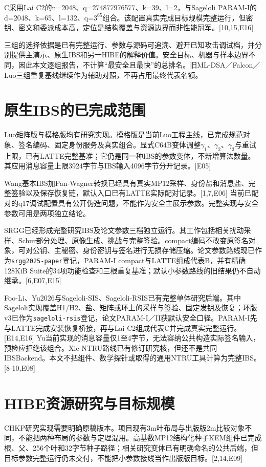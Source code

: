 \documentclass[UTF8,a4paper,12pt,oneside,openany,fontset=fandol]{ctexrep}
\begin{document}
C采用Lai C2的n=2048、q=274877976577、k=39、l=2，与Sageloli PARAM-I的d=2048、k=65、l=132、q=\(3^{65}\)组合。该配置真实完成目标规模完整运行，但密钥、密文和委派成本高，定位是结构覆盖与资源边界而非性能冠军。[10,15,E16]

三组的选择依据是已有完整运行、参数与源码可追溯、避开已知攻击调试档，并分别提供主演示、原生IBS和另一HIBE的解释价值。安全目标、机器与样本边界不同，因此本文逐组报告，不计算“最安全且最快”的总排名。旧ML-DSA／Falcon／Luo三组重复基线继续作为辅助对照，不再占用最终代表名额。

\section{原生IBS的已完成范围}
Luo矩阵版与模格版均有研究实现。模格版是当前Luo工程主线，已完成规范对象、签名编码、固定身份服务及真实组合。显式C64B变体调整\(\gamma_1\)、\(\gamma_2\)、\(\gamma_3\)与重试上限，已有LATTE完整基准；它仍是同一种IBS的参数变体，不新增算法数量。其应用消息容量上限3924字节与IBS输入4096字节分开记录。[E05]

Wang基本IBS加Pan-Wagner转换已经具有真实MP12采样、身份盐和消息盐、完整签验以及保存恢复链，默认入口已有LATTE实际配对记录。[1,7,E06] 当前已配对的q17调试配置具有公开伪造问题，不能作为安全主展示参数。完整实现与安全参数可用是两项独立结论。

SRGG已经形成完整研究IBS及论文参数三档独立运行。其工作包括相关扰动采样、Schur部分处理、原像生成、挑战与完整签验。compact编码不改变原签名对象，可对公钥、主秘密、身份密钥与签名进行无损存储压缩。论文参数路线现已作为\texttt{srgg2025-paper}登记，PARAM-I compact与LATTE组成代表B，并有精确128KiB Suite的34项功能检查和三根重复基准；默认小参数路线的旧结果仍不自动继承。[6,E07,E15]

Foo-Li、Yu2026与Sageloli-SIS、Sageloli-RSIS已有完整单体研究后端。其中Sageloli实现覆盖H1/H2、盐、矩阵或环上的采样与签验、固定发钥及恢复；环版v3已作为\texttt{sageloli-rsis}登记，论文PARAM-I／II获默认安全口径。PARAM-I先与LATTE完成安装恢复桥接，再与Lai C2组成代表C并完成真实完整运行。[E14,E16] Yu当前实现的消息容量仅1至4字节，无法容纳公共构造实际签名输入，预检应拒绝该组合。Xie-NTRU路线已有修订研究核，但还不是共同IBSBackend。本文不把组件、数学探针或取得的通用NTRU工具计算为完整IBS。[8-10,E08]

\section{HIBE资源研究与目标规模}
CHKP研究实现需要明确原稿版本。项目现有3m叶布局与出版版2m比较对象不同，不能把两种布局的参数与定理混用。高基数MP12结构化种子KEM组件已完成根、父、256个叶和32字节种子路径；相关研究变体已有明确命名的公共后端，但目标参数完整运行仍未交付，不能把小参数接线当作出版版目标。[2,14,E09]
\end{document}
